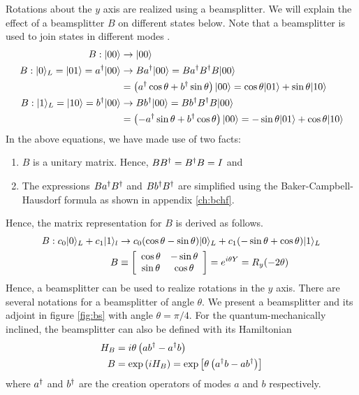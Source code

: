 Rotations about the $y$ axis are realized using a beamsplitter. We will explain the effect of a beamsplitter $B$ on different states below. Note that a beamsplitter is used to join states in different modes \cite{klm,nielsen2000}.
\begin{align}
B:|00\rangle &\rightarrow |00\rangle\\
B:|0\rangle_L = |01\rangle = a^\dagger|00\rangle &\rightarrow Ba^\dagger|00\rangle = Ba^\dagger B^\dagger B|00\rangle\\
&= \left(a^\dagger\cos\theta + b^\dagger\sin\theta\right)|00\rangle = \cos\theta|01\rangle + \sin\theta|10\rangle\\
B:|1\rangle_L = |10\rangle = b^\dagger|00\rangle &\rightarrow Bb^\dagger|00\rangle = Bb^\dagger B^\dagger B|00\rangle\\
&= \left(-a^\dagger\sin\theta + b^\dagger\cos\theta\right)|00\rangle = -\sin\theta|01\rangle + \cos\theta|10\rangle
\end{align}
In the above equations, we have made use of two facts: 
\begin{enumerate}
\item $B$ is a unitary matrix. Hence, $BB^\dagger = B^\dagger B = I$ and
\item The expressions $Ba^\dagger B^\dagger$ and $Bb^\dagger B^\dagger$ are simplified using the Baker-Campbell-Hausdorf formula as shown in appendix \ref{ch:bchf}.
\end{enumerate}
Hence, the matrix representation for $B$ is derived as follows.
\begin{align}
B: c_0|0\rangle_L + c_1|1\rangle_l &\rightarrow c_0(\cos\theta - \sin\theta)|0\rangle_L + c_1(-\sin\theta + \cos\theta)|1\rangle_L \\
B &\equiv \left[\begin{array}{cc}\cos\theta & -\sin\theta\\
\sin\theta & \cos\theta\end{array}\right] = e^{i\theta Y} = R_y(-2\theta)
\end{align}
Hence, a beamsplitter can be used to realize rotations in the $y$ axis. There are several notations for a beamsplitter of angle $\theta$. We present a beamsplitter and its adjoint in figure \ref{fig:bs} with angle $\theta = \pi/4$.
For the quantum-mechanically inclined, the beamsplitter can also be defined with its Hamiltonian
\begin{align}
H_B &= i\theta\left(ab^\dagger - a^\dagger b\right)\\
B &= \text{exp}\left(iH_B\right) = \text{exp}\left[\theta\left(a^\dagger b-ab^\dagger\right)\right]
\end{align}
where $a^\dagger$ and $b^\dagger$ are the creation operators of modes $a$ and $b$ respectively.

